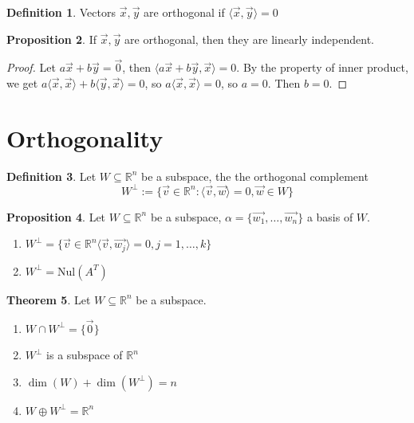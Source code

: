 \documentclass{article}
\theoremstyle{definition}
\newtheorem{theorem}{Theorem}[section]
\newtheorem{proposition}[theorem]{Proposition}
\newtheorem{definition}[theorem]{Definition}
\theoremstyle{remark}
\begin{document}
\begin{definition}
    Vectors $\vec{x},\vec{y}$ are orthogonal if $\langle\vec{x},\vec{y}\rangle=0$
\end{definition}

\begin{proposition}
    If $\vec{x},\vec{y}$ are orthogonal, then they are linearly independent.
\end{proposition}

\begin{proof}
    Let $a\vec{x}+b\vec{y}=\vec{0}$, then $\langle a\vec{x}+b\vec{y},\vec{x}\rangle=0$.
    By the property of inner product, we get $a\langle \vec{x},\vec{x}\rangle+ b\langle \vec{y},\vec{x}\rangle=0$, so $a\langle \vec{x},\vec{x}\rangle=0$, so $a=0$. Then $b=0$.
\end{proof}

\section{Orthogonality}

\begin{definition}
    Let $W\subseteq \mathbb{R}^n$ be a subspace, the the orthogonal complement
    \[
    W^{\perp}:=\{\vec{v}\in\mathbb{R}^n:\langle\vec{v},\vec{w}\rangle=0,\vec{w}\in W\}
    \]
\end{definition}

\begin{proposition}
    Let $W\subseteq \mathbb{R}^n$ be a subspace, $\alpha=\{\vec{w_1},\dots,\vec{w_n}\}$ a basis of $W$.
    \begin{enumerate}
        \item $W^{\perp}=\{\vec{v}\in\mathbb{R}^n\langle\vec{v},\vec{w_j}\rangle=0,j=1,\dots,k\}$
        \item $W^{\perp}=\text{Nul}(A^{T})$
    \end{enumerate}
\end{proposition}

\begin{theorem}
    Let $W\subseteq \mathbb{R}^n$ be a subspace.
\begin{enumerate}
    \item $W\cap W^{\perp}=\{\vec{0}\}$
    \item $W^{\perp}$ is a subspace of $\mathbb{R}^n$
    \item $\dim(W)+\dim(W^{\perp})=n$
    \item $W\oplus W^{\perp}=\mathbb{R}^n$
\end{enumerate}
\end{theorem}
\end{document}
